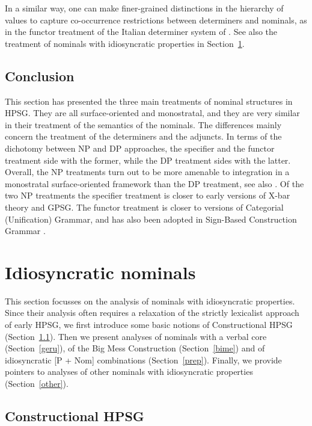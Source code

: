 \documentclass[output=paper
                ,modfonts
                ,nonflat
	        ,collection
	        ,collectionchapter
	        ,collectiontoclongg
 	        ,biblatex
                ,babelshorthands
                ,newtxmath
                ,draftmode
                ,colorlinks, citecolor=brown
]{./langsci/langscibook}
\begin{document}
In a similar way, one can make finer-grained distinctions in the hierarchy of  
 values to capture co-occurrence restrictions between determiners and 
nominals, as in the functor treatment of the Italian determiner system of 
\citet{Allegranza06}. See also the treatment of nominals with idiosyncratic properties 
in Section~\ref{idio}. 


\subsection{Conclusion} 


This section has presented the three main treatments of nominal structures in HPSG. 
They are all surface-oriented and monostratal, and they are very similar in their 
treatment of the semantics of the nominals. 
The differences mainly concern the treatment of the determiners and the adjuncts. 
In terms of the dichotomy between NP and DP approaches, the specifier and the functor 
treatment side with the former, while the DP treatment sides with the latter. 
Overall, the NP treatments turn out to be more amenable to integration  
in a monostratal surface-oriented framework than the DP treatment, see also \citet{MuellerHeadless}. 
Of the two NP treatments
the specifier treatment is closer to early versions of X-bar theory and GPSG.   
The functor treatment is closer to versions of Categorial (Unification) Grammar, and 
has also been adopted in Sign-Based Construction Grammar \citep[155--157]{Sag2012}.

 

\section{Idiosyncratic nominals}
\label{idio}


This section focusses on the analysis of nominals with idiosyncratic properties. 
Since their analysis often requires a relaxation of the strictly lexicalist approach 
of early HPSG, we first introduce some basic notions of Constructional HPSG (Section~\ref{cohp}). 
Then we present analyses of nominals with a verbal core (Section~\ref{geru}), 
of the Big Mess Construction (Section~\ref{bime}) and of idiosyncratic [P + Nom] combinations 
(Section~\ref{prep}). Finally, we provide pointers to analyses of other nominals with 
idiosyncratic properties (Section~\ref{other}). 


\subsection{Constructional HPSG} 
\label{cohp}
\end{document}
